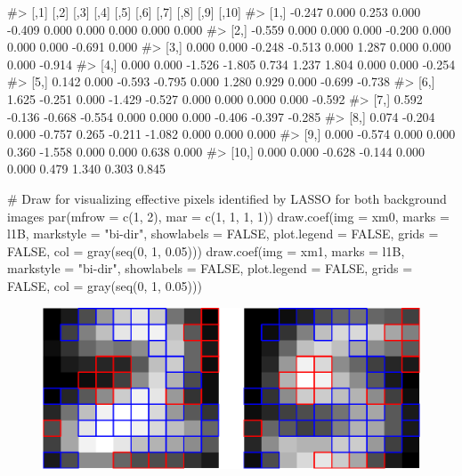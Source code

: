 \begin{Schunk}
\begin{Soutput}
#>         [,1]   [,2]   [,3]   [,4]   [,5]   [,6]   [,7]   [,8]   [,9]  [,10]
#>  [1,] -0.247  0.000  0.253  0.000 -0.409  0.000  0.000  0.000  0.000  0.000
#>  [2,] -0.559  0.000  0.000  0.000 -0.200  0.000  0.000  0.000 -0.691  0.000
#>  [3,]  0.000  0.000 -0.248 -0.513  0.000  1.287  0.000  0.000  0.000 -0.914
#>  [4,]  0.000  0.000 -1.526 -1.805  0.734  1.237  1.804  0.000  0.000 -0.254
#>  [5,]  0.142  0.000 -0.593 -0.795  0.000  1.280  0.929  0.000 -0.699 -0.738
#>  [6,]  1.625 -0.251  0.000 -1.429 -0.527  0.000  0.000  0.000  0.000 -0.592
#>  [7,]  0.592 -0.136 -0.668 -0.554  0.000  0.000  0.000 -0.406 -0.397 -0.285
#>  [8,]  0.074 -0.204  0.000 -0.757  0.265 -0.211 -1.082  0.000  0.000  0.000
#>  [9,]  0.000 -0.574  0.000  0.000  0.360 -1.558  0.000  0.000  0.638  0.000
#> [10,]  0.000  0.000 -0.628 -0.144  0.000  0.000  0.479  1.340  0.303  0.845
\end{Soutput}
\begin{Sinput}
# Draw for visualizing effective pixels identified by LASSO for both background images 
par(mfrow = c(1, 2), mar = c(1, 1, 1, 1))
draw.coef(img = xm0, marks = l1B, markstyle = "bi-dir", showlabels = FALSE, 
          plot.legend = FALSE, grids = FALSE, col = gray(seq(0, 1, 0.05)))
draw.coef(img = xm1, marks = l1B, markstyle = "bi-dir", showlabels = FALSE, 
          plot.legend = FALSE, grids = FALSE, col = gray(seq(0, 1, 0.05)))
\end{Sinput}
\begin{figure}

{\centering \includegraphics[width=0.95\linewidth]{chen-chang-chen-tzeng-chang_files/figure-latex/mnistlasso-1} 

}
\end{figure}
\end{Schunk}
